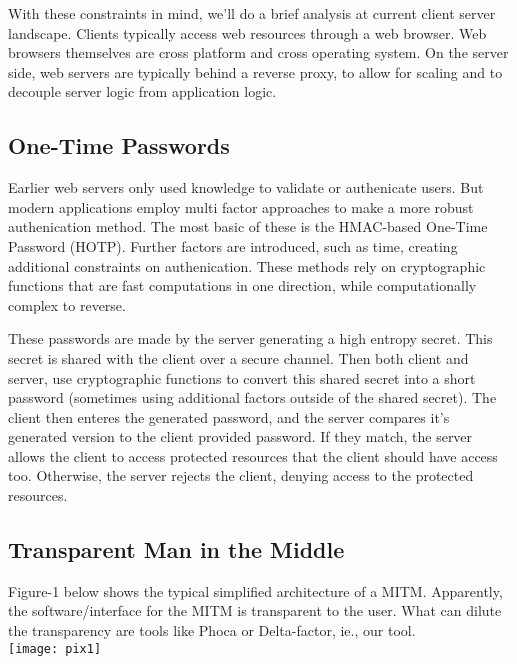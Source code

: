 \documentclass[a4paper, 11pt]{article} 				%
\begin{document}
With these constraints in mind, we'll do a brief analysis at current client server landscape. Clients typically access web resources through a web browser. Web browsers themselves are cross platform and cross operating system. On the server side, web servers are typically behind a reverse proxy, to allow for scaling and to decouple server logic from application logic. 

\subsection{One-Time Passwords}
Earlier web servers only used knowledge to validate or authenicate users. But modern applications employ multi factor approaches to make a more robust authenication method. The most basic of these is the HMAC-based One-Time Password (HOTP). Further factors are introduced, such as time, creating additional constraints on authenication. These methods rely on cryptographic functions that are fast computations in one direction, while computationally complex to reverse.

These passwords are made by the server generating a high entropy secret. This secret is shared with the client over a secure channel. Then both client and server, use cryptographic functions to convert this shared secret into a short password (sometimes using additional factors outside of the shared secret). The client then enteres the generated password, and the server compares it's generated version to the client provided password. If they match, the server allows the client to access protected resources that the client should have access too. Otherwise, the server rejects the client, denying access to the protected resources.

\subsection{Transparent Man in the Middle}
Figure-1 below shows the typical simplified architecture of a MITM. 
Apparently, the software/interface for the MITM is transparent to the user. What can dilute the transparency are tools like Phoca or Delta-factor, ie., our tool.\\

\texttt{[image: pix1]}
  
\end{document}
